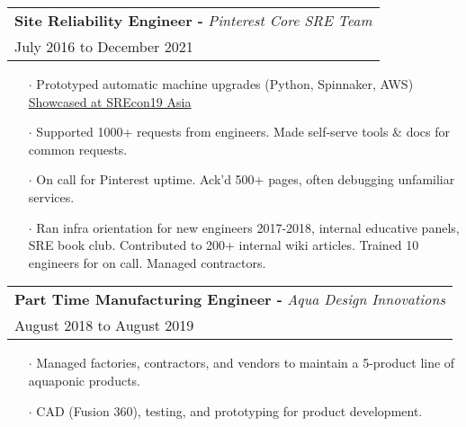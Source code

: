 \documentclass[letterpaper, oneside, final]{scrartcl} %
\begin{document}
\begin{center}
\begingroup\setlength{\fboxsep}{0pt}
\colorbox{mygray}{
\begin{flushleft}
\begin{tabularx}{\textwidth}{l}
\textbf{Site Reliability Engineer -} \textit{Pinterest Core SRE Team}\\
July 2016 to December 2021\\
\end{tabularx}
\end{flushleft}
}\endgroup
\vspace{-0.1cm}
\begin{itemize} \itemsep-0.2cm
\item[$\cdot$] Prototyped automatic machine upgrades (Python, Spinnaker, AWS) \underline{\href{https://www.usenix.org/conference/srecon19asia/presentation/menezes}{Showcased at SREcon19 Asia}}\\[10pt]
\item[$\cdot$] Supported 1000+ requests from engineers. Made self-serve tools \& docs for common requests.\\[10pt]
\item[$\cdot$] On call for Pinterest uptime. Ack'd 500+ pages, often debugging unfamiliar services.\\[10pt]
\item[$\cdot$] Ran infra orientation for new engineers 2017-2018, internal educative panels, SRE book club. Contributed to 200+ internal wiki articles. Trained 10 engineers for on call. Managed contractors.\\[10pt]

\end{itemize}

\begingroup\setlength{\fboxsep}{0pt}
\colorbox{mygray}{
\begin{flushleft}
\begin{tabularx}{\textwidth}{l}
\textbf{Part Time Manufacturing Engineer -} \textit{Aqua Design Innovations}\\
August 2018 to August 2019\\
\end{tabularx}
\end{flushleft}
}\endgroup
\vspace{-0.1cm}
\begin{itemize} \itemsep-0.2cm
\item[$\cdot$] Managed factories, contractors, and vendors to maintain a 5-product line of aquaponic products. \\
\item[$\cdot$] CAD (Fusion 360), testing, and prototyping for product development.\\
\end{itemize}


\end{center}
\end{document}
